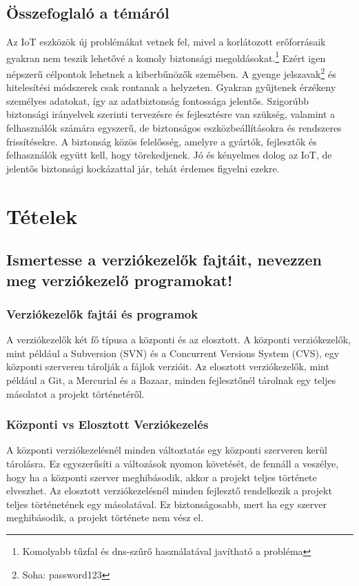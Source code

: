 \documentclass{report}
\begin{document}
		\section{Összefoglaló a témáról}
			Az IoT eszközök új problémákat vetnek fel, mivel a korlátozott erőforrásaik gyakran nem teszik lehetővé a komoly biztonsági megoldásokat.\footnote{Komolyabb tűzfal és dns-szűrő használatával javítható a probléma}  Ezért igen népszerű célpontok lehetnek a kiberbűnözők szemében. A gyenge jelszavak\footnote{Soha: password123} és hitelesítési módszerek csak rontanak a helyzeten.
			Gyakran gyűjtenek érzékeny személyes adatokat, így az adatbiztonság fontossága jelentős. Szigorúbb biztonsági irányelvek szerinti tervezésre és fejlesztésre van szükség, valamint a felhasználók számára egyszerű, de biztonságos eszközbeállításokra és rendszeres frissítésekre.
			A biztonság közös felelősség, amelyre a gyártók, fejlesztők és felhasználók együtt kell, hogy törekedjenek.
			Jó és kényelmes dolog az IoT, de jelentős biztonsági kockázattal jár, tehát érdemes figyelni ezekre.





	\chapter{Tételek}
		\section{Ismertesse a verziókezelők fajtáit, nevezzen meg verziókezelő programokat!}
			\subsection{Verziókezelők fajtái és programok}
				A verziókezelők két fő típusa a központi és az elosztott. A központi verziókezelők, mint például a Subversion (SVN) és a Concurrent Versions System (CVS), egy központi szerveren tárolják a fájlok verzióit. Az elosztott verziókezelők, mint például a Git, a Mercurial és a Bazaar, minden fejlesztőnél tárolnak egy teljes másolatot a projekt történetéről.
			
			\subsection{Központi vs Elosztott Verziókezelés}
				A központi verziókezelésnél minden változtatás egy központi szerveren kerül tárolásra. Ez egyszerűsíti a változások nyomon követését, de fennáll a veszélye, hogy ha a központi szerver meghibásodik, akkor a projekt teljes története elveszhet. Az elosztott verziókezelésnél minden fejlesztő rendelkezik a projekt teljes történetének egy másolatával. Ez biztonságosabb, mert ha egy szerver meghibásodik, a projekt története nem vész el.
			
\end{document}
